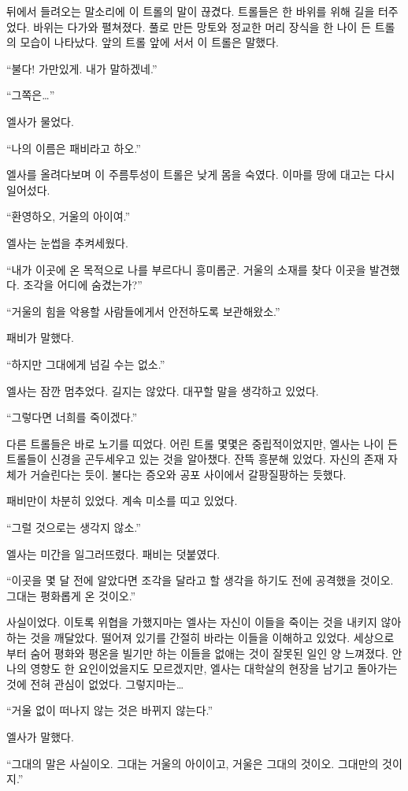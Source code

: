 뒤에서 들려오는 말소리에 이 트롤의 말이 끊겼다. 트롤들은 한 바위를 위해 길을 터주었다. 바위는 다가와 펼쳐졌다. 풀로 만든 망토와 정교한 머리 장식을 한 나이 든 트롤의 모습이 나타났다. 앞의 트롤 앞에 서서 이 트롤은 말했다.

``불다! 가만있게. 내가 말하겠네.''

``그쪽은\ldots''

엘사가 물었다.

``나의 이름은 패비라고 하오.''

엘사를 올려다보며 이 주름투성이 트롤은 낮게 몸을 숙였다. 이마를 땅에 대고는 다시 일어섰다.

``환영하오, 거울의 아이여.''

엘사는 눈썹을 추켜세웠다.

``내가 이곳에 온 목적으로 나를 부르다니 흥미롭군. 거울의 소재를 찾다 이곳을 발견했다. 조각을 어디에 숨겼는가?''

``거울의 힘을 악용할 사람들에게서 안전하도록 보관해왔소.''

패비가 말했다.

``하지만 그대에게 넘길 수는 없소.''

엘사는 잠깐 멈추었다. 길지는 않았다. 대꾸할 말을 생각하고 있었다.

``그렇다면 너희를 죽이겠다.''

다른 트롤들은 바로 노기를 띠었다. 어린 트롤 몇몇은 중립적이었지만, 엘사는 나이 든 트롤들이 신경을 곤두세우고 있는 것을 알아챘다. 잔뜩 흥분해 있었다. 자신의 존재 자체가 거슬린다는 듯이. 불다는 증오와 공포 사이에서 갈팡질팡하는 듯했다.

패비만이 차분히 있었다. 계속 미소를 띠고 있었다.

``그럴 것으로는 생각지 않소.''

엘사는 미간을 일그러뜨렸다. 패비는 덧붙였다.

``이곳을 몇 달 전에 알았다면 조각을 달라고 할 생각을 하기도 전에 공격했을 것이오. 그대는 평화롭게 온 것이오.''

사실이었다. 이토록 위협을 가했지마는 엘사는 자신이 이들을 죽이는 것을 내키지 않아 하는 것을 깨달았다. 떨어져 있기를 간절히 바라는 이들을 이해하고 있었다. 세상으로부터 숨어 평화와 평온을 빌기만 하는 이들을 없애는 것이 잘못된 일인 양 느껴졌다. 안나의 영향도 한 요인이었을지도 모르겠지만, 엘사는 대학살의 현장을 남기고 돌아가는 것에 전혀 관심이 없었다. 그렇지마는\ldots

``거울 없이 떠나지 않는 것은 바뀌지 않는다.''

엘사가 말했다.

``그대의 말은 사실이오. 그대는 거울의 아이이고, 거울은 그대의 것이오. 그대만의 것이지.''

